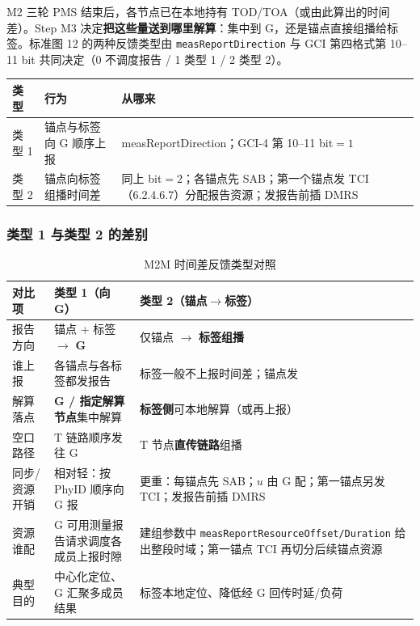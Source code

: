 \documentclass[11pt,a4paper]{ctexart}
\begin{document}
M2 三轮 PMS 结束后，各节点已在本地持有 TOD/TOA（或由此算出的时间差）。Step M3 决定\textbf{把这些量送到哪里解算}：集中到 G，还是锚点直接组播给标签。标准图 12 的两种反馈类型由 \texttt{measReportDirection} 与 GCI 第四格式第 10--11 bit 共同决定（0 不调度报告 / 1 类型 1 / 2 类型 2）。

\begin{table}[h]
\centering
\small
\begin{tabular}{L{2cm}L{5cm}L{5.5cm}}
\toprule
\textbf{类型} & \textbf{行为} & \textbf{从哪来} \\
\midrule
类型 1 & 锚点与标签向 G 顺序上报 & measReportDirection；GCI-4 第 10--11 bit$=1$ \\
类型 2 & 锚点向标签组播时间差 & 同上 bit$=2$；各锚点先 SAB；第一个锚点发 TCI（6.2.4.6.7）分配报告资源；发报告前插 DMRS \\
\bottomrule
\end{tabular}
\end{table}

\subsubsection{类型 1 与类型 2 的差别}

\begin{table}[h]
\centering
\small
\caption{M2M 时间差反馈类型对照}
\begin{tabular}{L{2.4cm}L{5.5cm}L{5.5cm}}
\toprule
\textbf{对比项} & \textbf{类型 1（向 G）} & \textbf{类型 2（锚点$\to$标签）} \\
\midrule
报告方向 & 锚点 + 标签 $\rightarrow$ \textbf{G} & 仅锚点 $\rightarrow$ \textbf{标签组播} \\
谁上报 & 各锚点与各标签都发报告 & 标签一般不上报时间差；锚点发 \\
解算落点 & \textbf{G / 指定解算节点}集中解算 & \textbf{标签侧}可本地解算（或再上报） \\
空口路径 & T 链路顺序发往 G & T 节点\textbf{直传链路}组播 \\
同步/资源开销 & 相对轻：按 PhyID 顺序向 G 报 & 更重：每锚点先 SAB；$u$ 由 G 配；第一锚点另发 TCI；发报告前插 DMRS \\
资源谁配 & G 可用测量报告请求调度各成员上报时隙 & 建组参数中 \texttt{measReportResourceOffset/Duration} 给出整段时域；第一锚点 TCI 再切分后续锚点资源 \\
典型目的 & 中心化定位、G 汇聚多成员结果 & 标签本地定位、降低经 G 回传时延/负荷 \\
\bottomrule
\end{tabular}
\end{table}
\end{document}
